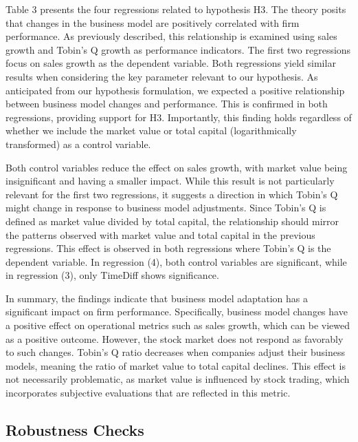 \documentclass[
]{article}
\begin{document}
\newpage{}

Table 3 presents the four regressions related to hypothesis H3. The
theory posits that changes in the business model are positively
correlated with firm performance. As previously described, this
relationship is examined using sales growth and Tobin's Q growth as
performance indicators. The first two regressions focus on sales growth
as the dependent variable. Both regressions yield similar results when
considering the key parameter relevant to our hypothesis. As anticipated
from our hypothesis formulation, we expected a positive relationship
between business model changes and performance. This is confirmed in
both regressions, providing support for H3. Importantly, this finding
holds regardless of whether we include the market value or total capital
(logarithmically transformed) as a control variable.

Both control variables reduce the effect on sales growth, with market
value being insignificant and having a smaller impact. While this result
is not particularly relevant for the first two regressions, it suggests
a direction in which Tobin's Q might change in response to business
model adjustments. Since Tobin's Q is defined as market value divided by
total capital, the relationship should mirror the patterns observed with
market value and total capital in the previous regressions. This effect
is observed in both regressions where Tobin's Q is the dependent
variable. In regression (4), both control variables are significant,
while in regression (3), only TimeDiff shows significance.

In summary, the findings indicate that business model adaptation has a
significant impact on firm performance. Specifically, business model
changes have a positive effect on operational metrics such as sales
growth, which can be viewed as a positive outcome. However, the stock
market does not respond as favorably to such changes. Tobin's Q ratio
decreases when companies adjust their business models, meaning the ratio
of market value to total capital declines. This effect is not
necessarily problematic, as market value is influenced by stock trading,
which incorporates subjective evaluations that are reflected in this
metric.

\subsection{Robustness Checks}\label{robustness-checks}
\end{document}

